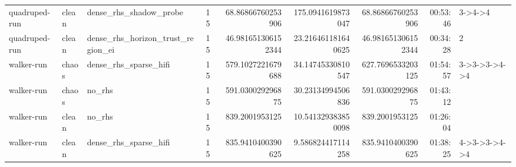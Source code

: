 \begin{tabular}{llllrrrrl}
quadruped-run & clean & dense\_rhs\_shadow\_probe & 15 & 68.86866760253906 & 175.0941619873047 & 68.86866760253906 & 00:53:46 & 3->4->4 \\
quadruped-run & clean & dense\_rhs\_horizon\_trust\_region\_ei & 15 & 46.981651306152344 & 23.216461181640625 & 46.981651306152344 & 00:34:28 & 2 \\
walker-run & chaos & dense\_rhs\_sparse\_hifi & 15 & 579.1027221679688 & 34.14745330810547 & 627.7696533203125 & 01:54:57 & 3->3->3->4->4 \\
walker-run & chaos & no\_rhs & 15 & 591.030029296875 & 30.23134994506836 & 591.030029296875 & 01:43:12 &  \\
walker-run & clean & no\_rhs & 15 & 839.2001953125 & 10.541329383850098 & 839.2001953125 & 01:26:04 &  \\
walker-run & clean & dense\_rhs\_sparse\_hifi & 15 & 835.9410400390625 & 9.586824417114258 & 835.9410400390625 & 01:38:25 & 4->3->3->4->4 \\
\bottomrule
\end{tabular}
